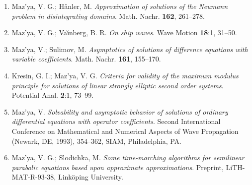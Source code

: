 \documentclass{article}
\begin{document}
\begin{enumerate}
{\bf 1993}
\item Maz'ya, V. G.; H{\"a}nler, M. {\it Approximation of solutions of
the
Neumann problem in disintegrating domains}.
  Math. Nachr. {\bf 162}, 261--278.
\item Maz'ya, V. G.; Va{\u\i}nberg, B. R. {\it On ship waves}. Wave
Motion
{\bf 18}:1, 31--50.
\item Maz'ya, V.; Sulimov, M. {\it Asymptotics of solutions of
difference
equations with variable coefficients}.
Math. Nachr. {\bf 161}, 155--170.
\item Kresin, G. I.; Maz'ya, V. G. {\it Criteria for validity of the
maximum modulus principle
for solutions of linear strongly elliptic second order systems}.
Potential
Anal. {\bf 2}:1, 73--99.
\item Maz'ya, V. {\it Solvability and asymptotic behavior of solutions
of
ordinary differential equations with operator
coefficients}. Second International Conference on Mathematical and
Numerical Aspects of Wave Propagation (Newark, DE, 1993),
354--362, SIAM, Philadelphia, PA.
\item Maz'ya, V. G.; Slodichka, M. {\it Some time-marching algorithms
for
semilinear parabolic equations based upon approximate
approximations}. Preprint, LiTH-MAT-R-93-38, Link\"oping
University.\hfill\break


\end{enumerate}
\end{document}
